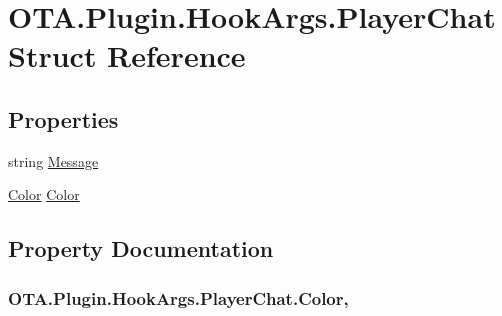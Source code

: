 \hypertarget{struct_o_t_a_1_1_plugin_1_1_hook_args_1_1_player_chat}{}\section{O\+T\+A.\+Plugin.\+Hook\+Args.\+Player\+Chat Struct Reference}
\label{struct_o_t_a_1_1_plugin_1_1_hook_args_1_1_player_chat}
\subsection*{Properties}
\begin{DoxyCompactItemize}
\item 
string \hyperlink{struct_o_t_a_1_1_plugin_1_1_hook_args_1_1_player_chat_ad686be9b4e3abb763b1d9552d3971cd1}{Message}
\item 
\hyperlink{struct_microsoft_1_1_xna_1_1_framework_1_1_color}{Color} \hyperlink{struct_o_t_a_1_1_plugin_1_1_hook_args_1_1_player_chat_af8a8a405a6cec53b420914af1ca74d2c}{Color}
\end{DoxyCompactItemize}


\subsection{Property Documentation}
\hypertarget{struct_o_t_a_1_1_plugin_1_1_hook_args_1_1_player_chat_af8a8a405a6cec53b420914af1ca74d2c}{}
\subsubsection[{Color}]{ O\+T\+A.\+Plugin.\+Hook\+Args.\+Player\+Chat.\+Color\hspace{0.3cm}{\ttfamily [get]}, {\ttfamily [set]}}\label{struct_o_t_a_1_1_plugin_1_1_hook_args_1_1_player_chat_af8a8a405a6cec53b420914af1ca74d2c}
\hypertarget{struct_o_t_a_1_1_plugin_1_1_hook_args_1_1_player_chat_ad686be9b4e3abb763b1d9552d3971cd1}{}
